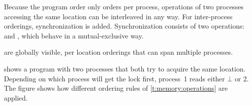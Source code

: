 Because the program order \SYMorderprog only orders per process, operations of two processes accessing the same location can be interleaved in any way.
For inter-process orderings, synchronization is added.
Synchronization consists of two operations: \emph{} and \emph{}, which behave in a mutual-exclusive way.
\begin{definition}
	 \SYMordersync* are globally visible, per location orderings that can span multiple processes.
\end{definition}

 shows a program with two processes that both try to acquire the same location.
Depending on which process will get the lock first, process~1 reads either $\bot$ or 2.
The figure shows how different ordering rules of \vref{t:memory:operations} are applied.

